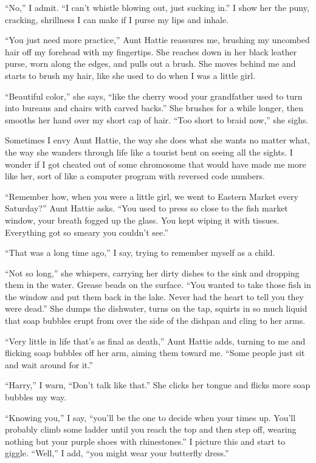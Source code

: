 \documentclass[
]{article}
\begin{document}
``No,'' I admit. ``I can't whistle blowing out, just sucking in.'' I
show her the puny, cracking, shrillness I can make if I purse my lips
and inhale.

``You just need more practice,'' Aunt Hattie reassures me, brushing my
uncombed hair off my forehead with my fingertips. She reaches down in
her black leather purse, worn along the edges, and pulls out a brush.
She moves behind me and starts to brush my hair, like she used to do
when I was a little girl.

``Beautiful color,'' she says, ``like the cherry wood your grandfather
used to turn into bureaus and chairs with carved backs.'' She brushes
for a while longer, then smooths her hand over my short cap of hair.
``Too short to braid now,'' she sighs.

Sometimes I envy Aunt Hattie, the way she does what she wants no matter
what, the way she wanders through life like a tourist bent on seeing all
the sights. I wonder if I got cheated out of some chromosome that would
have made me more like her, sort of like a computer program with
reversed code numbers.

``Remember how, when you were a little girl, we went to Eastern Market
every Saturday?'' Aunt Hattie asks. ``You used to press so close to the
fish market window, your breath fogged up the glass. You kept wiping it
with tissues. Everything got so smeary you couldn't see.''

``That was a long time ago,'' I say, trying to remember myself as a
child.

``Not so long,'' she whispers, carrying her dirty dishes to the sink and
dropping them in the water. Grease beads on the surface. ``You wanted to
take those fish in the window and put them back in the lake. Never had
the heart to tell you they were dead.'' She dumps the dishwater, turns
on the tap, squirts in so much liquid that soap bubbles erupt from over
the side of the dishpan and cling to her arms.

``Very little in life that's as final as death,'' Aunt Hattie adds,
turning to me and flicking soap bubbles off her arm, aiming them toward
me. ``Some people just sit and wait around for it.''

``Harry,'' I warn, ``Don't talk like that.'' She clicks her tongue and
flicks more soap bubbles my way.

``Knowing you,'' I say, ``you'll be the one to decide when your times
up. You'll probably climb some ladder until you reach the top and then
step off, wearing nothing but your purple shoes with rhinestones.'' I
picture this and start to giggle. ``Well,'' I add, ``you might wear your
butterfly dress.''
\end{document}
